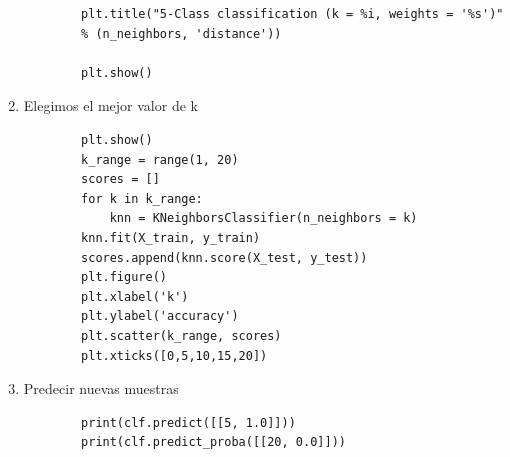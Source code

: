 \documentclass{article}
\begin{document}
\begin{enumerate}
\begin{verbatim}
        plt.title("5-Class classification (k = %i, weights = '%s')"
        % (n_neighbors, 'distance'))

        plt.show()
    \end{verbatim}
    \item Elegimos el mejor valor de k
    \begin{verbatim}
        plt.show()
        k_range = range(1, 20)
        scores = []
        for k in k_range:
            knn = KNeighborsClassifier(n_neighbors = k)
        knn.fit(X_train, y_train)
        scores.append(knn.score(X_test, y_test))
        plt.figure()
        plt.xlabel('k')
        plt.ylabel('accuracy')
        plt.scatter(k_range, scores)
        plt.xticks([0,5,10,15,20])
    \end{verbatim}
    \item Predecir nuevas muestras
    \begin{verbatim}
        print(clf.predict([[5, 1.0]]))
        print(clf.predict_proba([[20, 0.0]]))
    \end{verbatim}
\end{enumerate}
\end{document}
